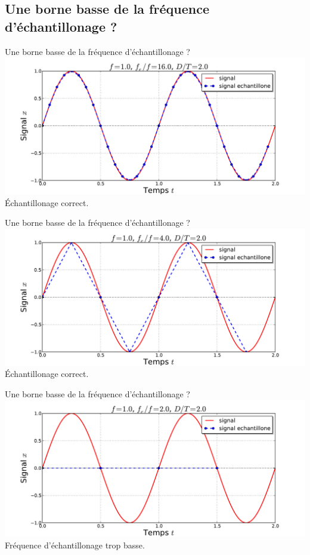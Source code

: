\documentclass[8pt,a4paper]{beamer}
\begin{document}
  \subsection{Une borne basse de la fréquence d'échantillonage ?}
  \begin{frame}{Une borne basse de la fréquence d'échantillonage ?}
  \includegraphics[width=1.\textwidth]{figures/echant_sin_0.pdf}\\
  \'Echantillonage correct.
  \end{frame}
  \begin{frame}{Une borne basse de la fréquence d'échantillonage ?}
  \includegraphics[width=1.\textwidth]{figures/echant_sin_1.pdf}\\
  \'Echantillonage correct.
  \end{frame}
  \begin{frame}{Une borne basse de la fréquence d'échantillonage ?}
  \includegraphics[width=1.\textwidth]{figures/echant_sin_5.pdf}\\
  \alert{Fréquence d'échantillonage trop basse.}
  \end{frame}
\end{document}

